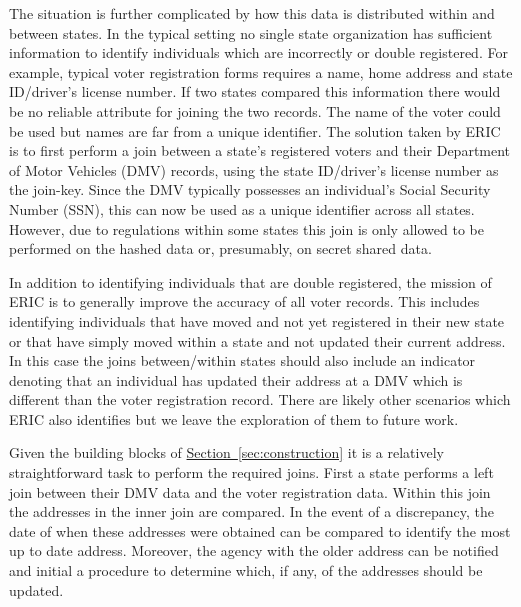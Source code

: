 \documentclass[11pt,letterpaper]{article}
\newcommand{\namedref}[2]{\hyperref[#2]{#1~\ref*{#2}}}
\newcommand{\sectionref}[1]{\namedref{Section}{#1}}
\begin{document}
The situation is further complicated by how this data is distributed within and between states. In the typical setting no single state organization has sufficient information to identify individuals which are incorrectly or double registered. For example, typical voter registration forms requires a name, home address and state ID/driver's license number. If two states compared this information there would be no reliable attribute for joining the two records. The name of the voter could be used but names are far from a unique identifier. The solution taken by ERIC is to first perform a join between a state's registered voters and their Department of Motor Vehicles (DMV) records, using the  state ID/driver's license number as the join-key. Since the DMV typically possesses an individual's Social Security Number (SSN), this can now be used as a unique identifier across all states. However, due to regulations within some states this join is only allowed to be performed on the hashed data or, presumably, on secret shared data.

In addition to identifying individuals that are double registered, the mission of ERIC is to generally improve the accuracy of all voter records. This includes identifying individuals that have moved and not yet registered in their new state or that have simply moved within a state and not updated their current address. In this case the joins between/within states should also include an indicator denoting that an individual has updated their address at a DMV which is different than the voter registration record. There are likely other scenarios which ERIC also identifies but we leave the exploration of them to future work.

Given the building blocks of \sectionref{sec:construction} it is a relatively straightforward task to perform the required joins. First a state performs a left join between their DMV data and the voter registration data. Within this join the addresses in the inner join are compared. In the event of a discrepancy, the date of when these addresses were obtained can be compared to identify the most up to date address. Moreover, the agency with the older address can be notified and initial a procedure to determine which, if any, of the addresses should be updated. 
\end{document}
